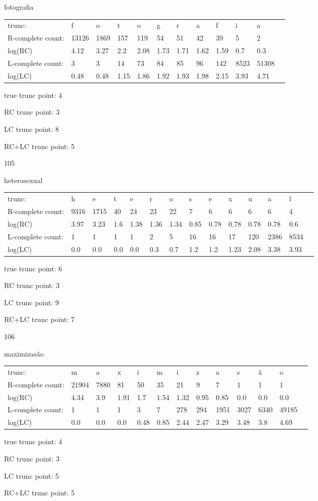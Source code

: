 \documentclass{article}
\begin{document}
fotografia

\begin{tabular}{l|lllllllllll}
trunc: & f & o & t & o & g & r & a & f & i & a & \\ 
R-complete count: & 13126 & 1869 & 157 & 119 & 54 & 51 & 42 & 39 & 5 & 2 & \\ 
log(RC) & 4.12 & 3.27 & 2.2 & 2.08 & 1.73 & 1.71 & 1.62 & 1.59 & 0.7 & 0.3 & \\ 
L-complete count: & 3 & 3 & 14 & 73 & 84 & 85 & 96 & 142 & 8523 & 51308 & \\ 
log(LC) & 0.48 & 0.48 & 1.15 & 1.86 & 1.92 & 1.93 & 1.98 & 2.15 & 3.93 & 4.71 & \\ 
\end{tabular}

true trunc point: 4

RC trunc point: 3

LC trunc point: 8

RC+LC trunc point: 5

\newpage

105

heterosexual

\begin{tabular}{l|lllllllllllll}
trunc: & h & e & t & e & r & o & s & e & x & u & a & l & \\ 
R-complete count: & 9316 & 1715 & 40 & 24 & 23 & 22 & 7 & 6 & 6 & 6 & 6 & 4 & \\ 
log(RC) & 3.97 & 3.23 & 1.6 & 1.38 & 1.36 & 1.34 & 0.85 & 0.78 & 0.78 & 0.78 & 0.78 & 0.6 & \\ 
L-complete count: & 1 & 1 & 1 & 1 & 2 & 5 & 16 & 16 & 17 & 120 & 2386 & 8534 & \\ 
log(LC) & 0.0 & 0.0 & 0.0 & 0.0 & 0.3 & 0.7 & 1.2 & 1.2 & 1.23 & 2.08 & 3.38 & 3.93 & \\ 
\end{tabular}

true trunc point: 6

RC trunc point: 3

LC trunc point: 9

RC+LC trunc point: 7

\vspace{1em}

106

maximizasão

\begin{tabular}{l|llllllllllll}
trunc: & m & a & x & i & m & i & z & a & s & ã & o & \\ 
R-complete count: & 21904 & 7880 & 81 & 50 & 35 & 21 & 9 & 7 & 1 & 1 & 1 & \\ 
log(RC) & 4.34 & 3.9 & 1.91 & 1.7 & 1.54 & 1.32 & 0.95 & 0.85 & 0.0 & 0.0 & 0.0 & \\ 
L-complete count: & 1 & 1 & 1 & 3 & 7 & 278 & 294 & 1951 & 3027 & 6340 & 49185 & \\ 
log(LC) & 0.0 & 0.0 & 0.0 & 0.48 & 0.85 & 2.44 & 2.47 & 3.29 & 3.48 & 3.8 & 4.69 & \\ 
\end{tabular}

true trunc point: 4

RC trunc point: 3

LC trunc point: 5

RC+LC trunc point: 5

\vspace{1em}
\end{document}
